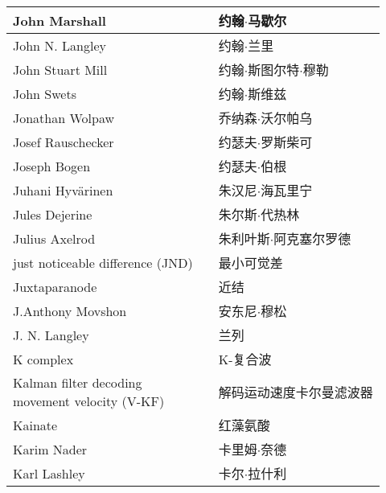\begin{longtable}{lll}
	\midrule
	John Marshall   && 约翰$\cdot$马歇尔  \\
	
	\midrule
	John N. Langley   && 约翰$\cdot$兰里  \\
	
	\midrule
	John Stuart Mill   && 约翰$\cdot$斯图尔特$\cdot$穆勒  \\
	
	\midrule
	John Swets   && 约翰$\cdot$斯维兹  \\
	
	\midrule
	Jonathan Wolpaw   && 乔纳森$\cdot$沃尔帕乌  \\
	
	\midrule
	Josef Rauschecker   && 约瑟夫$\cdot$罗斯柴可  \\
	
	\midrule
	Joseph Bogen   && 约瑟夫$\cdot$伯根  \\
	
	\midrule
	Juhani Hyvärinen   && 朱汉尼$\cdot$海瓦里宁  \\
	
	\midrule
	Jules Dejerine   && 朱尔斯$\cdot$代热林  \\
	
	\midrule
	Julius Axelrod   && 朱利叶斯$\cdot$阿克塞尔罗德  \\
	
	\midrule
	just noticeable difference (JND)   && 最小可觉差  \\
	
	\midrule
	Juxtaparanode   && 近结  \\
	
	\midrule
	J.Anthony Movshon   && 安东尼$\cdot$穆松  \\
	
	\midrule
	J. N. Langley   && 兰列  \\
	
	\midrule
	K complex   && K-复合波  \\
	
	\midrule
	\makecell[l]{Kalman filter decoding \\movement velocity (V-KF)}   && 解码运动速度卡尔曼滤波器  \\
	
	\midrule
	Kainate   && 红藻氨酸  \\
	
	\midrule
	Karim Nader   && 卡里姆$\cdot$奈德  \\
	
	\midrule
	Karl Lashley  && 卡尔$\cdot$拉什利  \\
	

\end{longtable}
